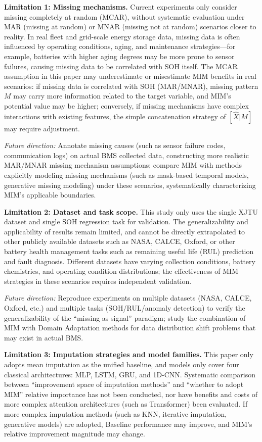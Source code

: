 \documentclass[5p,times]{elsarticle}
\begin{document}
\textbf{Limitation 1: Missing mechanisms.} Current experiments only consider missing completely at random (MCAR), without systematic evaluation under MAR (missing at random) or MNAR (missing not at random) scenarios closer to reality. In real fleet and grid-scale energy storage data, missing data is often influenced by operating conditions, aging, and maintenance strategies---for example, batteries with higher aging degrees may be more prone to sensor failures, causing missing data to be correlated with SOH itself. The MCAR assumption in this paper may underestimate or misestimate MIM benefits in real scenarios: if missing data is correlated with SOH (MAR/MNAR), missing pattern $M$ may carry more information related to the target variable, and MIM's potential value may be higher; conversely, if missing mechanisms have complex interactions with existing features, the simple concatenation strategy of $[\hat{X}|M]$ may require adjustment.

\textit{Future direction:} Annotate missing causes (such as sensor failure codes, communication logs) on actual BMS collected data, constructing more realistic MAR/MNAR missing mechanism assumptions; compare MIM with methods explicitly modeling missing mechanisms (such as mask-based temporal models, generative missing modeling) under these scenarios, systematically characterizing MIM's applicable boundaries.

\textbf{Limitation 2: Dataset and task scope.} This study only uses the single XJTU dataset and single SOH regression task for validation. The generalizability and applicability of results remain limited, and cannot be directly extrapolated to other publicly available datasets such as NASA, CALCE, Oxford, or other battery health management tasks such as remaining useful life (RUL) prediction and fault diagnosis. Different datasets have varying collection conditions, battery chemistries, and operating condition distributions; the effectiveness of MIM strategies in these scenarios requires independent validation.

\textit{Future direction:} Reproduce experiments on multiple datasets (NASA, CALCE, Oxford, etc.) and multiple tasks (SOH/RUL/anomaly detection) to verify the generalizability of the ``missing as signal'' paradigm; study the combination of MIM with Domain Adaptation methods for data distribution shift problems that may exist in actual BMS.

\textbf{Limitation 3: Imputation strategies and model families.} This paper only adopts mean imputation as the unified baseline, and models only cover four classical architectures: MLP, LSTM, GRU, and 1D-CNN. Systematic comparison between ``improvement space of imputation methods'' and ``whether to adopt MIM'' relative importance has not been conducted, nor have benefits and costs of more complex attention architectures (such as Transformer) been evaluated. If more complex imputation methods (such as KNN, iterative imputation, generative models) are adopted, Baseline performance may improve, and MIM's relative improvement magnitude may change.
\end{document}
